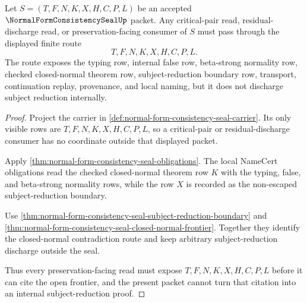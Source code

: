 \begin{theorem}
\label{thm:normal-form-consistency-seal-critical-pair-route}
Let $S=(T,F,N,K,X,H,C,P,L)$ be an accepted $\NormalFormConsistencySealUp$
packet. Any critical-pair read, residual-discharge read, or preservation-facing
consumer of $S$ must pass through the displayed finite route
$$
T,F,N,K,X,H,C,P,L .
$$
The route exposes the typing row, internal false row, beta-strong normality row,
checked closed-normal theorem row, subject-reduction boundary row, transport,
continuation replay, provenance, and local naming, but it does not discharge
subject reduction internally.
\end{theorem}
\begin{proof}
Project the carrier in
\autoref{def:normal-form-consistency-seal-carrier}. Its only visible rows are
$T,F,N,K,X,H,C,P,L$, so a critical-pair or residual-discharge consumer has no
coordinate outside that displayed packet.

Apply \autoref{thm:normal-form-consistency-seal-obligations}. The local
NameCert obligations read the checked closed-normal theorem row $K$ with the
typing, false, and beta-strong normality rows, while the row $X$ is recorded as
the non-escaped subject-reduction boundary.

Use
\autoref{thm:normal-form-consistency-seal-subject-reduction-boundary} and
\autoref{thm:normal-form-consistency-seal-closed-normal-frontier}. Together
they identify the closed-normal contradiction route and keep arbitrary
subject-reduction discharge outside the seal.

Thus every preservation-facing read must expose $T,F,N,K,X,H,C,P,L$ before it
can cite the open frontier, and the present packet cannot turn that citation
into an internal subject-reduction proof.
\end{proof}

